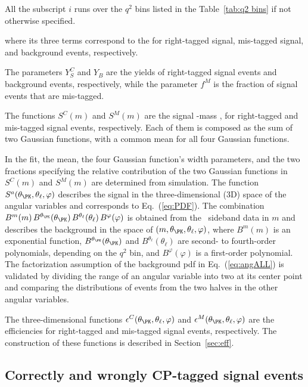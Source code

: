 All the subscript $i$ runs over the $q^2$ bins listed in the Table~\ref{tab:q2 bins} if not otherwise specified.

where its three terms correspond to the \pdfs for right-tagged signal, mis-tagged signal, and background events, respectively.

The parameters $Y^{C}_{S}$ and $Y_{B}$ are the yields of right-tagged signal events and background events, respectively, while the parameter $f^{M}$ is the fraction of signal events that are mis-tagged.

The functions $S^{C}(m)$ and $S^{M}(m)$ are the signal \PBz-mass \pdfs, for right-tagged and mis-tagged signal events, respectively.
Each of them is composed as the sum of two Gaussian functions, with a common mean for all four Gaussian functions.

In the fit, the mean, the four Gaussian function's width parameters, and the two fractions specifying the relative contribution of the two Gaussian functions in $S^{C}(m)$ and $S^{M}(m)$ are determined from simulation.
The function $S^a(\theta_\PK,\theta_\ell,\varphi)$ describes the signal in the three-dimensional (3D) space of the angular variables and corresponds to Eq.~(\ref{eq:PDF}).
The combination $B^m(m) \, B^{\theta_\PK}(\theta_\PK) \, B^{\theta_\ell}(\theta_\ell) \, B^{\varphi}(\varphi)$ is obtained from the \PBz\ sideband data in $m$ and describes the background in the space of $(m,\theta_\PK,\theta_\ell,\varphi)$, where $B^m(m)$ is an exponential function, $B^{\theta_\PK}(\theta_\PK)$ and $B^{\theta_\ell}(\theta_\ell)$ are second- to fourth-order polynomials, depending on the $q^2$ bin, and $B^{\varphi}(\varphi)$ is a first-order polynomial.
The factorization assumption of the background pdf in Eq.~(\ref{eq:angALL}) is validated by dividing the range of an angular variable into two at its center point and comparing the distributions of events from the two halves in the other angular variables.

The three-dimensional functions $\epsilon^{C}(\theta_\PK,\theta_\ell,\varphi)$ and $\epsilon^{M}(\theta_\PK,\theta_\ell,\varphi)$ are the efficiencies for right-tagged and mis-tagged signal events, respectively.
The construction of these functions is described in Section~\ref{sec:eff}.

\subsection{Correctly and wrongly CP-tagged signal events}
\label{sec:fullform}

